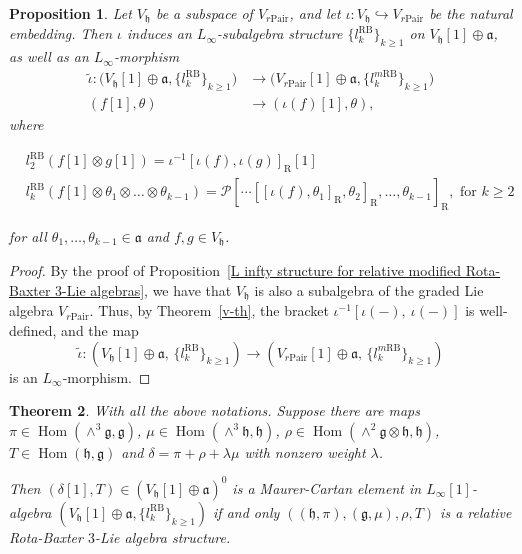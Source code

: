 \documentclass[12pt]{amsart}
\newtheorem{theorem}{Theorem}[section]
\newtheorem{prop}[theorem]{Proposition}
\theoremstyle{definition}
\begin{document}
\begin{prop}
	Let $V_{\mathfrak{h}}$
	be a subspace of \( V_{r\mathrm{Pair}} \), and let \( \iota: V_{\mathfrak{h}} \hookrightarrow V_{r\mathrm{Pair}} \) be the natural embedding. Then \( \iota \) induces an $L_\infty$-subalgebra structure \( \{l^{\mathrm{RB}}_k\}_{k \geq 1} \) on \( V_{\mathfrak{h}}[1] \oplus \mathfrak{a} \), as well as an $L_\infty$-morphism
	\begin{align*}
		\tilde{\iota}: \big(V_{\mathfrak{h}}[1] \oplus \mathfrak{a},\{l^{\mathrm{RB}}_k\}_{k \geq 1} \big) &\longrightarrow \big(V_{r\mathrm{Pair}}[1] \oplus \mathfrak{a},\{l^{m\mathrm{RB}}_k\}_{k \geq 1} \big)\\
		(f[1],\theta)&\longrightarrow (\iota(f)[1],\theta),
	\end{align*}
	where
	
	$$
	\begin{aligned}
		&	l^{\mathrm{RB}}_2(f[1]\otimes g[1])	=\iota^{-1}[\iota(f),\iota(g)]_{\mathrm{R}}[1]\\
		&	l^{\mathrm{RB}}_k\left(f[1]\otimes \theta_1\otimes \ldots\otimes \theta_{k-1}\right)=\mathcal{P}\left[\cdots\left[\left[\iota(f), \theta_1\right]_{\mathrm{R}}, \theta_2\right]_{\mathrm{R}}, \ldots, \theta_{k-1}\right]_{\mathrm{R}}, \text { for } k \geq 2
	\end{aligned}
	$$
	
	for all $\theta_1,\ldots,\theta_{k-1}\in \mathfrak{a}$ and $f,g\in V_{\mathfrak{h}}$.
	
\end{prop}

\begin{proof}
	By the proof of Proposition~\ref{L infty  structure for relative  modified Rota-Baxter 3-Lie algebras}, we have that $V_{\mathfrak{h}}$ is also a subalgebra of the graded Lie algebra $V_{r\mathrm{Pair}}$.  Thus, by Theorem~\ref{v-th}, the bracket $\iota^{-1}[\iota(-),\ \iota(-)]$ is well-defined, and the map
	\[
	\tilde{\iota} \colon \left(V_{\mathfrak{h}}[1] \oplus \mathfrak{a},\, \{l^{\mathrm{RB}}_k\}_{k \geq 1} \right)
	\longrightarrow
	\left(V_{r\mathrm{Pair}}[1] \oplus \mathfrak{a},\, \{l^{m\mathrm{RB}}_k\}_{k \geq 1} \right)
	\]
	is an $L_\infty$-morphism.
\end{proof}

\begin{theorem}\label{Thm: MC of relative RB}
	With all the above notations.     Suppose  there are maps $\pi\in \operatorname{Hom}(\wedge^3\mathfrak{g},\mathfrak{g})$, $\mu\in \operatorname{Hom}(\wedge^3\mathfrak{h},\mathfrak{h})$, $\rho\in \operatorname{Hom}(\wedge^2 \mathfrak{g}\otimes \mathfrak{h}  , \mathfrak{h})$, $T\in \operatorname{Hom}(  \mathfrak{h}  , \mathfrak{g})$ and $\delta=\pi+\rho+\lambda\mu$ with nonzero weight $\lambda$.
	
	Then $(\delta[1], T)\in (V_{\mathfrak{h}}[1] \oplus \mathfrak{a})^0$ is a  Maurer-Cartan element in $L_\infty[1]$-algebra $(V_{\mathfrak{h}}[1] \oplus \mathfrak{a}, \{l^{\mathrm{RB}}_k\}_{k\geq 1} )$ if and only  $\left( \left(\mathfrak{h},\pi\right),\left(\mathfrak{g},\mu\right),\rho,T\right) $  is   a relative  Rota-Baxter $3$-Lie algebra structure.
\end{theorem}
\end{document}
